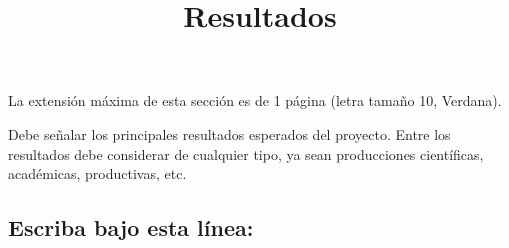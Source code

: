 \documentclass[10pt,prl]{revtex4}
\begin{document}
\title{Resultados}
\maketitle

La extensi\'on m\'axima de esta secci\'on es de 1 p\'agina (letra tama\~no 10, Verdana).

Debe se\~nalar los principales resultados esperados del proyecto. Entre los resultados debe considerar de cualquier tipo, ya sean producciones cient\'ificas, acad\'emicas, productivas, etc.

\maketitle
\subsection{Escriba bajo esta l\'inea:}
\end{document}
